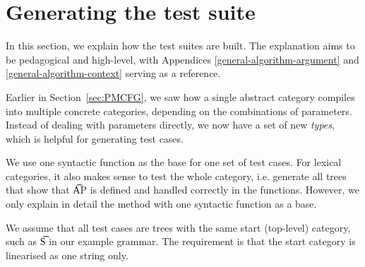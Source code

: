 



\section{Generating the test suite}
\label{sec:testing}

In this section, we explain how the test suites are built. The
explanation aims to be pedagogical and high-level, with Appendices
\ref{general-algorithm-argument} and \ref{general-algorithm-context}
serving as a reference.

Earlier in Section~\ref{sec:PMCFG}, we saw how a single abstract category
compiles into multiple concrete categories, depending on the
combinations of parameters. Instead of dealing with parameters
directly, we now have a set of new \emph{types}, which is helpful for
generating test cases.

We use one syntactic function as the base for one set of test
cases. For lexical categories, it also makes sense to test the whole
category, i.e. generate all trees that show that \t{AP} is defined and
handled correctly in the functions. However, we only explain in detail
the method with one syntactic function as a base.

We assume that all test cases are trees with the same start
(top-level) category, such as \t{S} in our example grammar. The
requirement is that the start category is linearised as one string only. 

